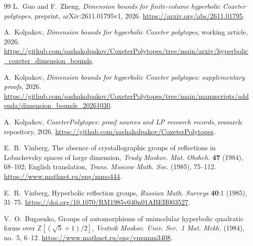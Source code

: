 \documentclass[11pt]{article}
\theoremstyle{definition}
\theoremstyle{remark}
\numberwithin{equation}{section}
\newcommand{\Z}{\mathbb Z}
\begin{document}
\begin{thebibliography}{99}
L.~Guo and F.~Zheng, \emph{Dimension bounds for finite-volume hyperbolic
Coxeter polytopes}, preprint, arXiv:2611.01795v1, 2026.
\url{https://arxiv.org/abs/2611.01795}.

A.~Kolpakov, \emph{Dimension bounds for hyperbolic Coxeter polytopes},
working article, 2026.
\url{https://github.com/sashakolpakov/CoxeterPolytopes/tree/main/arxiv/hyperbolic_coxeter_dimension_bounds}.

A.~Kolpakov, \emph{Dimension bounds for hyperbolic Coxeter polytopes:
supplementary proofs}, 2026.
\url{https://github.com/sashakolpakov/CoxeterPolytopes/tree/main/manuscripts/addenda/dimension_bounds_20261030}.

A.~Kolpakov, \emph{CoxeterPolytopes: proof sources and LP research
records}, research repository, 2026.
\url{https://github.com/sashakolpakov/CoxeterPolytopes}.

E.~B.~Vinberg, The absence of crystallographic groups of reflections
in Lobachevsky spaces of large dimension,
\emph{Trudy Moskov. Mat. Obshch.} \textbf{47} (1984), 68--102;
English translation, \emph{Trans. Moscow Math. Soc.} (1985), 75--112.
\url{https://www.mathnet.ru/eng/mmo444}.

E.~B.~Vinberg, Hyperbolic reflection groups,
\emph{Russian Math. Surveys} \textbf{40}:1 (1985), 31--75.
\url{https://doi.org/10.1070/RM1985v040n01ABEH003527}.

V.~O.~Bugaenko, Groups of automorphisms of unimodular hyperbolic
quadratic forms over $\Z[(\sqrt5+1)/2]$,
\emph{Vestnik Moskov. Univ. Ser.~1 Mat. Mekh.} (1984), no.~5, 6--12.
\url{https://www.mathnet.ru/eng/vmumm3408}.
\end{thebibliography}
\end{document}
